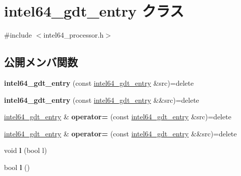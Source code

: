 \hypertarget{classintel64__gdt__entry}{}\section{intel64\+\_\+gdt\+\_\+entry クラス}
\label{classintel64__gdt__entry}


{\ttfamily \#include $<$intel64\+\_\+processor.\+h$>$}

\subsection*{公開メンバ関数}
\begin{DoxyCompactItemize}
\item 
\hypertarget{classintel64__gdt__entry_add6680b03a055fb4036f7beac8265234}{}{\bfseries intel64\+\_\+gdt\+\_\+entry} (const \hyperlink{classintel64__gdt__entry}{intel64\+\_\+gdt\+\_\+entry} \&src)=delete\label{classintel64__gdt__entry_add6680b03a055fb4036f7beac8265234}

\item 
\hypertarget{classintel64__gdt__entry_ab4d847662cabdb86c4ac7110e6acc628}{}{\bfseries intel64\+\_\+gdt\+\_\+entry} (const \hyperlink{classintel64__gdt__entry}{intel64\+\_\+gdt\+\_\+entry} \&\&src)=delete\label{classintel64__gdt__entry_ab4d847662cabdb86c4ac7110e6acc628}

\item 
\hypertarget{classintel64__gdt__entry_ac94d67eede4e2d4c2584444cd671adb3}{}\hyperlink{classintel64__gdt__entry}{intel64\+\_\+gdt\+\_\+entry} \& {\bfseries operator=} (const \hyperlink{classintel64__gdt__entry}{intel64\+\_\+gdt\+\_\+entry} \&src)=delete\label{classintel64__gdt__entry_ac94d67eede4e2d4c2584444cd671adb3}

\item 
\hypertarget{classintel64__gdt__entry_aa80cb4acf6c8ae6455e7db41963bf206}{}\hyperlink{classintel64__gdt__entry}{intel64\+\_\+gdt\+\_\+entry} \& {\bfseries operator=} (const \hyperlink{classintel64__gdt__entry}{intel64\+\_\+gdt\+\_\+entry} \&\&src)=delete\label{classintel64__gdt__entry_aa80cb4acf6c8ae6455e7db41963bf206}

\item 
\hypertarget{classintel64__gdt__entry_a5aa7d1cf8508890c007f7f9136d97a12}{}void {\bfseries l} (bool l)\label{classintel64__gdt__entry_a5aa7d1cf8508890c007f7f9136d97a12}

\item 
\hypertarget{classintel64__gdt__entry_af850014b898488c6ea660302254987de}{}bool {\bfseries l} ()\label{classintel64__gdt__entry_af850014b898488c6ea660302254987de}


\end{DoxyCompactItemize}
